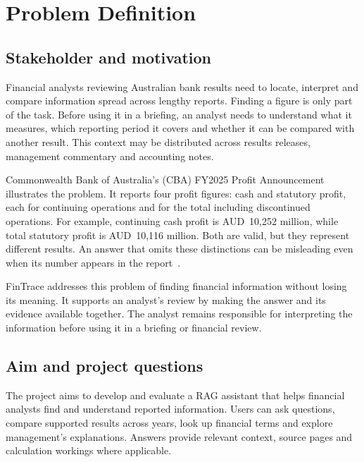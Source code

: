 \section{Problem Definition}
\label{sec:Problem Definition}

\subsection{Stakeholder and motivation}
Financial analysts reviewing Australian bank results need to locate, interpret and compare information spread across lengthy reports. Finding a figure is only part of the task. Before using it in a briefing, an analyst needs to understand what it measures, which reporting period it covers and whether it can be compared with another result. This context may be distributed across results releases, management commentary and accounting notes.

Commonwealth Bank of Australia's (CBA) FY2025 Profit Announcement illustrates the problem. It reports four profit figures: cash and statutory profit, each for continuing operations and for the total including discontinued operations. For example, continuing cash profit is AUD~10,252 million, while total statutory profit is AUD~10,116 million. Both are valid, but they represent different results. An answer that omits these distinctions can be misleading even when its number appears in the report~\cite{fintraceCBA2025}.

FinTrace addresses this problem of finding financial information without losing its meaning. It supports an analyst's review by making the answer and its evidence available together. The analyst remains responsible for interpreting the information before using it in a briefing or financial review.

\subsection{Aim and project questions}
The project aims to develop and evaluate a RAG assistant that helps financial analysts find and understand reported information. Users can ask questions, compare supported results across years, look up financial terms and explore management's explanations. Answers provide relevant context, source pages and calculation workings where applicable.

